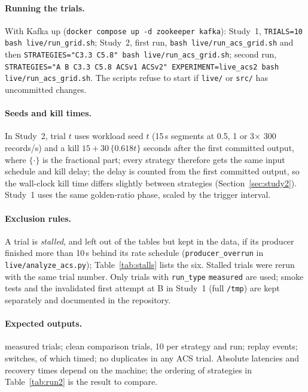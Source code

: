 \documentclass[10pt,twocolumn]{article}
\begin{document}
\paragraph{Running the trials.}
With Kafka up (\texttt{docker compose up -d zookeeper kafka}):
Study~1, \texttt{TRIALS=10 bash live/run\_grid.sh};
Study~2, first run, \texttt{bash live/run\_acs\_grid.sh} and then
\texttt{STRATEGIES="C3.3 C5.8" bash live/run\_acs\_grid.sh};
second run,
\texttt{STRATEGIES="A B C3.3 C5.8 ACSv1 ACSv2" EXPERIMENT=live\_acs2 bash
live/run\_acs\_grid.sh}. The scripts refuse to start if \texttt{live/} or
\texttt{src/} has uncommitted changes.

\paragraph{Seeds and kill times.}
In Study~2, trial $t$ uses workload seed $t$ (15\,s segments at 0.5, 1 or
3$\times$ 300 records/s) and a kill $15 + 30\,\{0.618t\}$ seconds after the first
committed output, where $\{\cdot\}$ is the fractional part; every strategy
therefore gets the same input schedule and kill delay; the delay is counted
from the first committed output, so the wall-clock kill time differs slightly
between strategies (Section~\ref{sec:study2}). Study~1 uses the same
golden-ratio phase, scaled by the trigger interval.

\paragraph{Exclusion rules.}
A trial is \emph{stalled}, and left out of the tables but kept in the data, if
its producer finished more than 10\,s behind its rate schedule
(\texttt{producer\_overrun} in \texttt{live/analyze\_acs.py});
Table~\ref{tab:stalls} lists the six. Stalled trials were rerun with the same
trial number. Only trials with \texttt{run\_type} \texttt{measured} are used;
smoke tests and the invalidated first attempt at B in Study~1 (full
\texttt{/tmp}) are kept separately and documented in the repository.

\paragraph{Expected outputs.}
\AllTrials{} measured trials; \CleanTrials{} clean comparison trials, 10 per
strategy and run; \ReplayEvents{} replay events; \Switches{} switches, of which
\SwitchN{} timed; no duplicates in any ACS trial. Absolute latencies and
recovery times depend on the machine; the ordering of strategies in
Table~\ref{tab:run2} is the result to compare.



\end{document}
